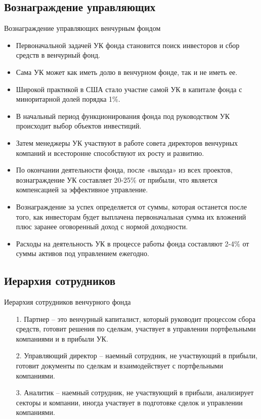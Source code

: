 \documentclass[_Venture_p1.tex]{subfiles}
\begin{document}
\subsection{Вознаграждение управляющих}
\begin{frame}[allowframebreaks]{Вознаграждение управляющих венчурным фондом}
\begin{itemize}
	\item Первоначальной задачей УК фонда становится поиск инвесторов и сбор средств в венчурный фонд. 
	\item Сама УК может как иметь долю в венчурном фонде, так и не иметь ее. 
	\item Широкой практикой в США стало участие самой УК в капитале фонда с миноритарной долей порядка 1\%. 
	
	\pagebreak
	\item В начальный период функционирования фонда под руководством УК происходит выбор объектов инвестиций.
	\item Затем менеджеры УК участвуют в работе совета директоров венчурных компаний и всесторонне способствуют  их росту и развитию. 
	\item По окончании деятельности фонда, после «выхода» из всех проектов, вознаграждение УК составляет 20-25\% от прибыли, что является компенсацией за эффективное управление. 
	\pagebreak
	\item Вознаграждение за успех определяется от суммы, которая останется после того, как инвесторам будет выплачена первоначальная сумма  их вложений плюс заранее оговоренный доход с нормой доходности.
	\item Расходы на деятельность УК в процессе работы фонда составляют 2-4\% от суммы активов под управлением ежегодно.
\end{itemize}
\end{frame}

\subsection{Иерархия сотрудников}
\begin{frame}{Иерархия сотрудников венчурного фонда }
\begin{itemize}
	\item[1.] Партнер – это венчурный капиталист, который руководит процессом сбора средств, готовит решения по сделкам, участвует в управлении портфельными компаниями и в прибыли УК.
	\item[2.] Управляющий директор – наемный сотрудник, не участвующий в прибыли, готовит документы по сделкам и взаимодействует с портфельными компаниями.
	\item[3.] Аналитик – наемный сотрудник, не участвующий в прибыли, анализирует секторы и компании, иногда участвует в подготовке сделок и управлении компаниями.
	
\end{itemize}
\end{frame}
\end{document}
